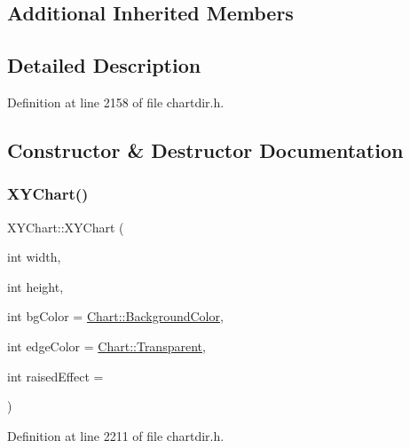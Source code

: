 \subsection*{Additional Inherited Members}


\subsection{Detailed Description}


Definition at line 2158 of file chartdir.\+h.



\subsection{Constructor \& Destructor Documentation}
\mbox{\label{class_x_y_chart_af88de18a1c96e62c74532ca9386b5a11}} 
\subsubsection{\texorpdfstring{X\+Y\+Chart()}{XYChart()}}
{\footnotesize\ttfamily X\+Y\+Chart\+::\+X\+Y\+Chart (\begin{DoxyParamCaption}\item[{int}]{width,  }\item[{int}]{height,  }\item[{int}]{bg\+Color = {\ttfamily \hyperlink{namespace_chart_abee0d882fdc9ad0b001245ad9fc64011a134193bde693b9d152d0c6dc59fa7d7f}{Chart\+::\+Background\+Color}},  }\item[{int}]{edge\+Color = {\ttfamily \hyperlink{namespace_chart_abee0d882fdc9ad0b001245ad9fc64011afc6811800a9e2582dac0157b6279f836}{Chart\+::\+Transparent}},  }\item[{int}]{raised\+Effect = {} }\end{DoxyParamCaption})\hspace{0.3cm}{\ttfamily [inline]}}



Definition at line 2211 of file chartdir.\+h.

